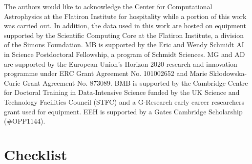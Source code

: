 \documentclass[dvipsnames,table]{article}
\begin{document}
\newpage
\begin{ack}
The authors would like to acknowledge the Center for Computational Astrophysics at the Flatiron Institute for hospitality while a portion of this work was carried out. In addition, the data used in this work are hosted on equipment supported by the Scientific Computing Core at the Flatiron Institute, a division of the Simons Foundation. MB is supported by the Eric and Wendy Schmidt AI in Science Postdoctoral Fellowship, a program of Schmidt Sciences. MG and AD are supported by the European Union’s Horizon 2020 research and innovation programme under ERC Grant Agreement No. 101002652 and Marie Skłodowska-Curie Grant Agreement No. 873089. BMB is supported by the Cambridge Centre for Doctoral Training in Data-Intensive Science funded by the UK Science and Technology Facilities Council (STFC) and a G-Research early career researchers grant used for equipment. EEH is supported by a Gates Cambridge Scholarship (\#OPP1144).
\end{ack}




\section*{Checklist}
\end{document}

